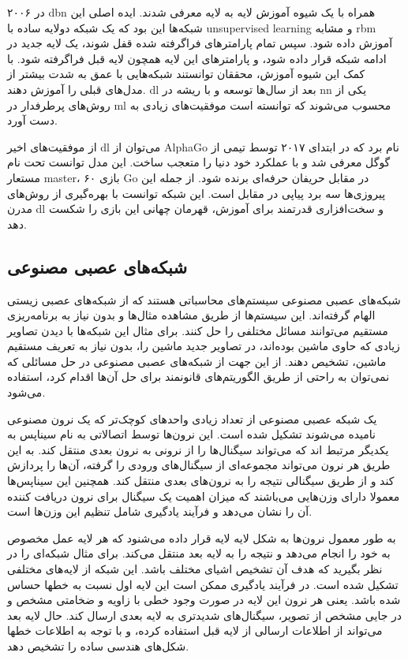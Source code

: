 در ۲۰۰۶ \gls{dbn} همراه با یک شیوه آموزش لایه به لایه معرفی شدند. ایده اصلی این
شبکه‌ها این بود که یک شبکه دولایه ساده با \gls{unsupervised learning} و مشابه
\gls{rbm} آموزش داده شود. سپس تمام پارامترهای فراگرفته شده قفل شوند، یک لایه
جدید در ادامه شبکه قرار داده شود، و پارامترهای این لایه همچون لایه قبل فراگرفته
شود. با کمک این شیوه آموزش، محققان توانستند شبکه‌هایی با عمق به شدت بیشتر از
مدل‌های قبلی را آموزش دهند. \gls{dl} بعد از سال‌ها توسعه و با ریشه در \gls{nn}
یکی از روش‌های پرطرفدار در \gls{ml} محسوب می‌شوند که توانسته است موفقیت‌های
زیادی به دست آورد.

از موفقیت‌های اخیر \gls{dl} می‌توان از AlphaGo نام برد که در ابتدای ۲۰۱۷ توسط
تیمی از گوگل معرفی شد و با عملکرد خود دنیا را متعجب ساخت. این مدل توانست تحت نام
مستعار master، ۶۰ بازی Go در مقابل حریفان حرفه‌ای برنده شود. از جمله این
پیروزی‌ها سه برد پیاپی در مقابل  است. این شبکه توانست با بهره‌گیری از
روش‌های مدرن \gls{dl} و سخت‌افزاری قدرتمند برای آموزش، قهرمان چهانی این بازی را
شکست دهد.

\subsection{شبکه‌های عصبی مصنوعی}
شبکه‌های عصبی مصنوعی سیستم‌های محاسباتی هستند که از شبکه‌های عصبی زیستی الهام
گرفته‌اند. این سیستم‌ها از طریق مشاهده مثال‌ها و بدون نیاز به برنامه‌ریزی مستقیم
می‌توانند مسائل مختلفی را حل کنند. برای مثال این شبکه‌ها با دیدن تصاویر زیادی که
حاوی ماشین بوده‌اند، در تصاویر جدید ماشین را، بدون نیاز به تعریف مستقیم ماشین،
تشخیص دهند. از این جهت از شبکه‌های عصبی مصنوعی در حل مسائلی که نمی‌توان به راحتی
از طریق الگوریتم‌های قانونمند برای حل آن‌ها اقدام کرد، استفاده می‌شود.

یک شبکه عصبی مصنوعی از تعداد زیادی واحدهای کوچک‌تر که یک نرون مصنوعی نامیده
می‌شوند تشکیل شده است. این نرون‌ها توسط اتصالاتی به نام سیناپس به یکدیگر مرتبط
اند که می‌تواند سیگنال‌ها را از نرونی به نرون بعدی منتقل کند. به این طریق هر
نرون می‌تواند مجموعه‌ای از سیگنال‌های ورودی را گرفته، آن‌ها را پردازش کند و از
طریق سیگنالی نتیجه را به نرون‌های بعدی منتقل کند. همچنین این سیناپس‌ها معمولا
دارای وزن‌هایی می‌باشند که میزان اهمیت یک سیگنال برای نرون دریافت کننده آن را
نشان می‌دهد و فرآیند یادگیری شامل تنظیم این وزن‌ها است.

به طور معمول نرون‌ها به شکل لایه لایه قرار داده می‌شنود که هر لایه عمل مخصوص به
خود را انجام می‌دهد و نتیجه را به لایه بعد منتقل می‌کند. برای مثال شبکه‌ای را در
نظر بگیرید که هدف آن تشخیص اشیای مختلف باشد. این شبکه از لایه‌های مختلفی تشکیل
شده است. در فرآیند یادگیری ممکن است این لایه اول نسبت به خطها حساس شده باشد.
یعنی هر نرون این لایه در صورت وجود خطی با زاویه و ضخامتی مشخص و در جایی مشخص از
تصویر، سیگنال‌های شدیدتری به لایه بعدی ارسال کند. حال لایه بعد می‌تواند از
اطلاعات ارسالی از لایه قبل استفاده کرده، و با توجه به اطلاعات خطها شکل‌های هندسی
ساده را تشخیص دهد.


